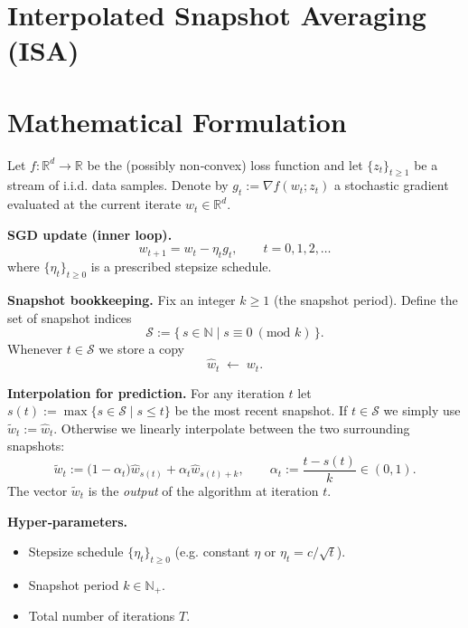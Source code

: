 \documentclass{article}
\newcommand{\RR}{\mathbb{R}}
\begin{document}
\section*{Interpolated Snapshot Averaging (ISA)}

\section*{Mathematical Formulation}
Let $f:\RR^{d}\rightarrow\RR$ be the (possibly non‑convex) loss function and let 
$\{z_t\}_{t\ge 1}$ be a stream of i.i.d. data samples.  
Denote by $g_t:=\nabla f(w_t;z_t)$ a stochastic gradient evaluated at the current iterate
$w_t\in\RR^{d}$.  

\medskip
\noindent\textbf{SGD update (inner loop).}
\begin{equation}
\label{eq:sgd}
w_{t+1}=w_t-\eta_t g_t ,\qquad t=0,1,2,\dots
\end{equation}
where $\{\eta_t\}_{t\ge0}$ is a prescribed stepsize schedule.

\medskip
\noindent\textbf{Snapshot bookkeeping.}
Fix an integer $k\ge 1$ (the snapshot period).  
Define the set of snapshot indices
\[
\mathcal{S}:=\{\, s\in\mathbb{N}\mid s\equiv 0\ (\text{mod }k)\,\}.
\]
Whenever $t\in\mathcal{S}$ we store a copy
\[
\widehat w_{t}\;\leftarrow\; w_t .
\]

\medskip
\noindent\textbf{Interpolation for prediction.}
For any iteration $t$ let $s(t):=\max\{s\in\mathcal{S}\mid s\le t\}$ be the most recent snapshot.
If $t\in\mathcal{S}$ we simply use $\widetilde w_t:=\widehat w_{t}$.
Otherwise we linearly interpolate between the two surrounding snapshots:
\begin{equation}
\label{eq:interp}
\widetilde w_t:=\bigl(1-\alpha_t\bigr)\widehat w_{s(t)}+\alpha_t \widehat w_{s(t)+k},
\qquad 
\alpha_t:=\frac{t-s(t)}{k}\in(0,1).
\end{equation}
The vector $\widetilde w_t$ is the \emph{output} of the algorithm at iteration $t$.

\medskip
\noindent\textbf{Hyper‑parameters.}
\begin{itemize}[noitemsep]
\item Stepsize schedule $\{\eta_t\}_{t\ge0}$ (e.g. constant $\eta$ or $\eta_t=c/\sqrt{t}$).
\item Snapshot period $k\in\mathbb{N}_{+}$.
\item Total number of iterations $T$.
\end{itemize}
\end{document}

